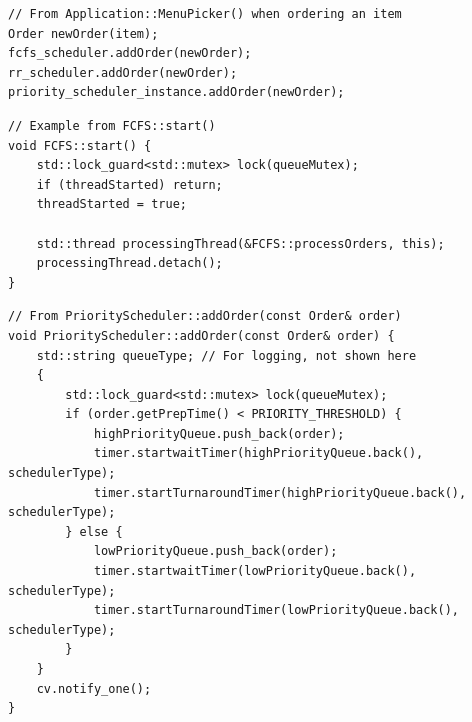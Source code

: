 \documentclass[a4paper,12pt]{article}
\begin{document}
\begin{verbatim}
// From Application::MenuPicker() when ordering an item
Order newOrder(item);
fcfs_scheduler.addOrder(newOrder);
rr_scheduler.addOrder(newOrder);
priority_scheduler_instance.addOrder(newOrder);
    \end{verbatim}

\begin{verbatim}
// Example from FCFS::start()
void FCFS::start() {
    std::lock_guard<std::mutex> lock(queueMutex); 
    if (threadStarted) return; 
    threadStarted = true;
    
    std::thread processingThread(&FCFS::processOrders, this);
    processingThread.detach(); 
}
\end{verbatim}

\begin{verbatim}
// From PriorityScheduler::addOrder(const Order& order)
void PriorityScheduler::addOrder(const Order& order) {
    std::string queueType; // For logging, not shown here
    {
        std::lock_guard<std::mutex> lock(queueMutex); 
        if (order.getPrepTime() < PRIORITY_THRESHOLD) {
            highPriorityQueue.push_back(order);
            timer.startwaitTimer(highPriorityQueue.back(), schedulerType);
            timer.startTurnaroundTimer(highPriorityQueue.back(), schedulerType);
        } else {
            lowPriorityQueue.push_back(order);
            timer.startwaitTimer(lowPriorityQueue.back(), schedulerType);
            timer.startTurnaroundTimer(lowPriorityQueue.back(), schedulerType);
        }
    }
    cv.notify_one(); 
}
\end{verbatim}
\end{document}
